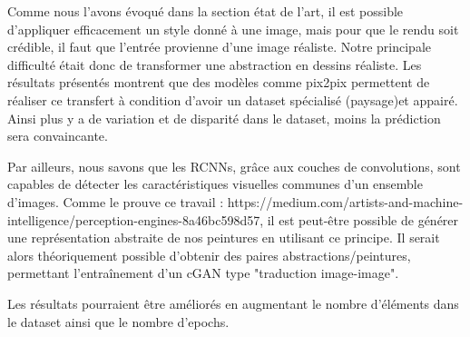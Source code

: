 \documentclass[a4paper, 12pt]{report}
\begin{document}
Comme nous l'avons évoqué dans la section état de l'art, il est possible d'appliquer efficacement un style donné à une image, mais pour que le rendu soit crédible, il faut que l'entrée provienne d'une image réaliste. Notre principale difficulté était donc de transformer une abstraction en dessins réaliste. Les résultats présentés montrent que des modèles comme pix2pix permettent de réaliser ce transfert à condition d'avoir un dataset spécialisé (paysage)et appairé. Ainsi plus y a de variation et de disparité dans le dataset, moins la prédiction sera convaincante.

Par ailleurs, nous savons que les RCNNs, grâce aux couches de convolutions, sont capables de détecter les caractéristiques visuelles communes d'un ensemble d'images. Comme le prouve ce travail : https://medium.com/artists-and-machine-intelligence/perception-engines-8a46bc598d57, il est peut-être possible de générer une représentation abstraite de nos peintures en utilisant ce principe. Il serait alors théoriquement possible d'obtenir des paires abstractions/peintures, permettant l'entraînement d'un cGAN type "traduction image-image". 

Les résultats pourraient être améliorés en augmentant le nombre d'éléments dans le dataset ainsi que le nombre d'epochs.




\end{document}
